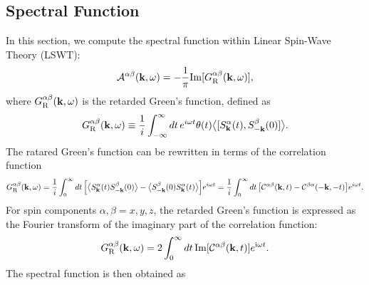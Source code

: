 \documentclass[aps, prx, nofootinbib, superscriptaddress]{revtex4-2}
\newcommand{\kvec}{\mathbf{k}}
\newcommand{\ri}{\mathrm{i}}
\begin{document}
\subsection{Spectral Function}\label{subsec: Spectral Function}

In this section, we compute the spectral function within Linear Spin-Wave Theory (LSWT):
\begin{equation}
    \mathcal{A}^{\alpha\beta}(\kvec, \omega) = - \frac{1}{\pi} \mathrm{Im} [G^{\alpha\beta}_{\rm R} (\kvec, \omega)],
\end{equation}
where $G^{\alpha\beta}_{\rm R} (\kvec, \omega)$ is the retarded Green's function, defined as
\begin{equation}
    G^{\alpha\beta}_{\rm R} (\kvec, \omega) 
    \equiv  \frac{1}{i} \int_{-\infty}^{\infty} dt \, e^{i\omega t} \theta(t) \big\langle [S_{\kvec}^{\alpha} (t), S_{-\kvec}^{\beta} (0)] \big\rangle . 
\end{equation}
The ratared Green's function can be rewritten in terms of the correlation function
\begin{equation}
    G^{\alpha\beta}_{\rm R} (\kvec, \omega) 
    = \frac{1}{i} \int_{0}^{\infty} dt \, \Big[ \big\langle S_{\kvec}^{\alpha} (t) S_{-\kvec}^{\beta} (0) \big\rangle - \big\langle S_{-\kvec}^{\beta} (0) S_{\kvec}^{\alpha} (t) \big\rangle \Big] e^{i \omega t} 
    = \frac{1}{i} \int_{0}^{\infty} dt \, \big[ \mathcal{C}^{\alpha\beta}(\kvec, t) - \mathcal{C}^{\beta\alpha}(-\kvec, -t) \big] e^{i \omega t}.
\end{equation}
For spin components $\alpha, \beta = x, y, z$, the retarded Green's function is expressed as the Fourier transform of the imaginary part of the correlation function:
\begin{equation}
    G^{\alpha\beta}_{\rm R} (\kvec, \omega) 
    = 2 \int_{0}^{\infty} dt \, \mathrm{Im} [\mathcal{C}^{\alpha\beta}(\kvec, t) ] e^{\ri \omega t}.
\end{equation}
The spectral function is then obtained as
\end{document}
